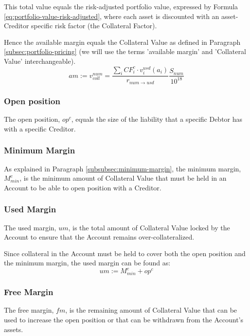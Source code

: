\documentclass[sigconf,nonacm]{acmart}
\begin{document}
This total value equals the risk-adjusted portfolio value, expressed by Formula \ref{eq:portfolio-value-risk-adjusted},
where each asset is discounted with an asset-Creditor specific risk factor (the Collateral Factor).

Hence the available margin equals the Collateral Value as defined in Paragraph \ref{subsec:portfolio-pricing}
(we will use the terms 'available margin' and 'Collateral Value' interchangeable).
\begin{equation}
    \label{eq:available-margin}
    am := v_{coll}^{num} = \frac{\sum_{i}{CF_{i}^{c} \cdot v^{usd}_{i}(a_{i})}}{r_{num\rightarrow usd}}\frac{S_{num}}{10^{18}}
\end{equation}

\subsubsection{Open position}
The open position, $op^c$, equals the size of the liability that a specific Debtor has with a specific Creditor.

\subsubsection{Minimum Margin}
As explained in Paragraph \ref{subsubsec:minimum-margin}, the minimum margin, $M_{min}^c$, 
is the minimum amount of Collateral Value that must be held in an Account to be able to open position with a Creditor.

\subsubsection{Used Margin}
The used margin, $um$, is the total amount of Collateral Value locked by the Account to ensure that the Account remains over-collateralized.

Since collateral in the Account must be held to cover both the open position and the minimum margin, the used margin can be found as:
\begin{equation}
    um := M_{min}^c + op^c
\end{equation}

\subsubsection{Free Margin}
The free margin, $fm$, is the remaining amount of Collateral Value that can be used to increase the open position or that can be withdrawn from the Account's assets.
\end{document}
